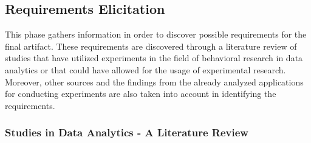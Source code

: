 

\subsection{Requirements Elicitation}

This phase gathers information in order to discover possible requirements for the final artifact. These requirements are discovered through a literature review of studies that have utilized experiments in the field of behavioral research in data analytics or that could have allowed for the usage of experimental research. Moreover, other sources and the findings from the already analyzed applications for conducting experiments are also taken into account in identifying the requirements.

\subsubsection{Studies in Data Analytics - A Literature Review}\label{subsec:literature_review_requirements}

